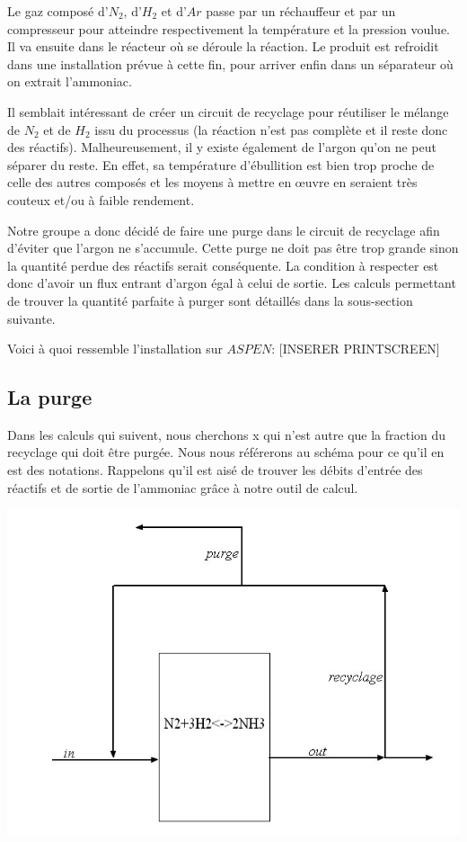 \documentclass[a4paper, oneside, 12pt]{article}
\begin{document}
Le gaz composé d'$N_2$, d'$H_2$ et d'$Ar$ passe par un réchauffeur et 
par un compresseur pour atteindre respectivement la température et la pression voulue. 
Il va ensuite dans le réacteur où se déroule la réaction. 
Le produit est refroidit dans une installation prévue à cette fin, 
pour arriver enfin dans un séparateur où on extrait l'ammoniac. 

Il semblait intéressant de créer un circuit de recyclage pour réutiliser 
le mélange de $N_2$ et de $H_2$ issu du processus (la réaction n'est pas complète 
et il reste donc des réactifs). 
Malheureusement, il y existe également de l'argon qu'on ne peut séparer du reste. 
En effet, sa température d'ébullition est bien trop proche de celle des autres composés et 
les moyens à mettre en œuvre en seraient très couteux et/ou à faible rendement. 

Notre groupe a donc décidé de faire une purge dans le circuit de recyclage 
afin d'éviter que l'argon ne s'accumule. Cette purge ne doit pas être trop grande 
sinon la quantité perdue des réactifs serait conséquente. 
La condition à respecter est donc d'avoir un flux entrant d'argon égal à celui de sortie. 
Les calculs permettant de trouver la quantité parfaite à purger 
sont détaillés dans la sous-section suivante.

Voici à quoi ressemble l'installation sur $ASPEN$:
[INSERER PRINTSCREEN]

\subsection{La purge}

Dans les calculs qui suivent, nous cherchons x qui n'est autre que la fraction du recyclage 
qui doit être purgée. Nous nous référerons au schéma pour ce qu'il en est des notations. 
Rappelons qu'il est aisé de trouver les débits d'entrée des réactifs 
et de sortie de l'ammoniac grâce à notre outil de calcul.

\includegraphics[scale=0.5]{etape_finale_simpl.jpg} 
\end{document}
